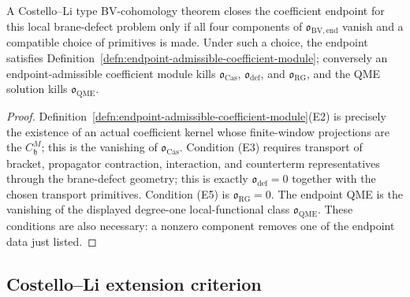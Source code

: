 \begin{prop}
\label{prop:bv-endpoint-obstruction-tuple}
  A Costello--Li type BV-cohomology theorem closes the coefficient
  endpoint for this local brane-defect problem only if all four
  components of
  \(\mathfrak o_{\mathrm{BV,end}}\) vanish and a compatible choice of
  primitives is made.  Under such a choice, the endpoint satisfies
  Definition~\ref{defn:endpoint-admissible-coefficient-module}; conversely
  an endpoint-admissible coefficient module kills
  \(\mathfrak o_{\mathrm{Cas}}\), \(\mathfrak o_{\mathrm{def}}\), and
  \(\mathfrak o_{\mathrm{RG}}\), and the QME solution kills
  \(\mathfrak o_{\mathrm{QME}}\).
\end{prop}

\begin{proof}
  Definition~\ref{defn:endpoint-admissible-coefficient-module}(E2) is
  precisely the existence of an actual coefficient kernel whose
  finite-window projections are the \(C^M_{\mathfrak h}\); this is the
  vanishing of \(\mathfrak o_{\mathrm{Cas}}\).  Condition (E3) requires
  transport of bracket, propagator contraction, interaction, and
  counterterm representatives through the brane-defect geometry; this
  is exactly \(\mathfrak o_{\mathrm{def}}=0\) together with the chosen
  transport primitives.  Condition (E5) is
  \(\mathfrak o_{\mathrm{RG}}=0\).  The endpoint QME is the vanishing of
  the displayed degree-one local-functional class
  \(\mathfrak o_{\mathrm{QME}}\).  These conditions are also necessary:
  a nonzero component removes one of the endpoint data just listed.
\end{proof}

\subsection*{Costello--Li extension criterion}

